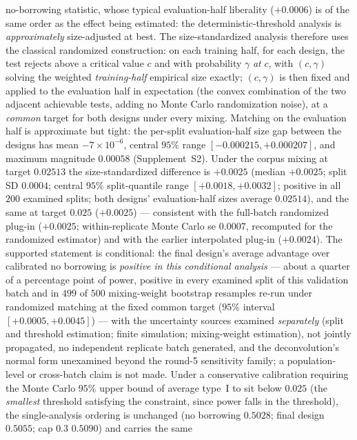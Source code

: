 \documentclass[11pt]{article}
\begin{document}
no-borrowing statistic, whose typical evaluation-half liberality
($+0.0006$) is of the same order as the effect being estimated: the
deterministic-threshold analysis is \emph{approximately} size-adjusted
at best. The size-standardized analysis therefore uses the classical
randomized construction: on each training half, for each design,
the test rejects above a critical value $c$ and with probability
$\gamma$ \emph{at} $c$, with $(c, \gamma)$ solving the weighted
\emph{training-half} empirical size exactly; $(c, \gamma)$ is then
fixed and applied to
the evaluation half in expectation (the convex combination of the two
adjacent achievable tests, adding no Monte Carlo randomization noise),
at a \emph{common} target for both designs under every mixing.
Matching on the evaluation half is approximate but tight: the
per-split evaluation-half size gap between the designs has mean
$-7\times 10^{-6}$, central $95\%$ range $[-0.000215, +0.000207]$, and
maximum magnitude $0.00058$ (Supplement~S2). Under the corpus
mixing at target $0.02513$ the size-standardized difference is $+0.0025$
(median $+0.0025$; split SD $0.0004$; central $95\%$ split-quantile
range $[+0.0018, +0.0032]$; positive in all $200$ examined splits; both
designs' evaluation-half sizes average $0.02514$), and the same at
target $0.025$ ($+0.0025$) --- consistent with the full-batch
randomized plug-in ($+0.0025$; within-replicate Monte Carlo se
$0.0007$, recomputed for the randomized estimator) and with the
earlier interpolated plug-in ($+0.0024$). The supported statement is
conditional: the final design's average advantage over calibrated no
borrowing is \emph{positive in this conditional analysis} --- about a
quarter of a percentage point of power, positive in every examined
split of this validation batch and in $499$ of $500$ mixing-weight
bootstrap resamples re-run under randomized matching at the fixed
common target ($95\%$ interval $[+0.0005, +0.0045]$) --- with the
uncertainty sources examined \emph{separately} (split and threshold
estimation; finite simulation; mixing-weight estimation), not jointly
propagated, no independent replicate batch generated, and the
deconvolution's normal form unexamined beyond the round-5 sensitivity
family; a population-level or cross-batch claim is not made. Under a conservative
calibration requiring the Monte Carlo $95\%$ upper bound of average
type~I to sit below $0.025$ (the \emph{smallest} threshold satisfying the
constraint, since power falls in the threshold), the single-analysis
ordering is unchanged (no borrowing
$0.5028$; final design $0.5055$; cap $0.3$ $0.5090$) and carries the same
\end{document}
